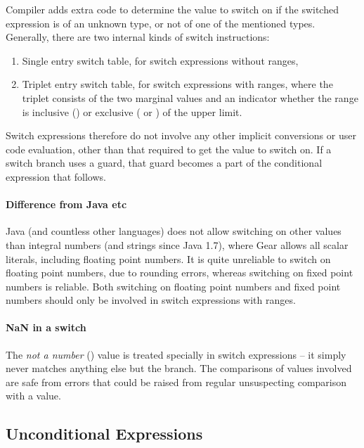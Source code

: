 Compiler adds extra code to determine the value to switch on if the switched expression is of an unknown type, or not of one of the mentioned types. Generally, there are two internal kinds of switch instructions:
\begin{enumerate}
  \item Single entry switch table, for switch expressions without ranges,
  \item Triplet entry switch table, for switch expressions with ranges, where the triplet consists of the two marginal values and an indicator whether the range is inclusive () or exclusive ( or ) of the upper limit. 
\end{enumerate}

Switch expressions therefore do not involve any other implicit conversions or user code evaluation, other than that required to get the value to switch on. If a switch branch uses a guard, that guard becomes a part of the conditional expression that follows. 

\paragraph{Difference from Java etc}
Java (and countless other languages) does not allow switching on other values than integral numbers (and strings since Java 1.7), where Gear allows all scalar literals, including floating point numbers. It is quite unreliable to switch on floating point numbers, due to rounding errors, whereas switching on fixed point numbers is reliable. Both switching on floating point numbers and fixed point numbers should only be involved in switch expressions with ranges. 

\paragraph{NaN in a switch}
The {\em not a number} () value is treated specially in switch expressions -- it simply never matches anything else but the  branch. The comparisons of values involved are safe from errors that could be raised from regular unsuspecting comparison with a  value. 






\subsection{Unconditional Expressions}

